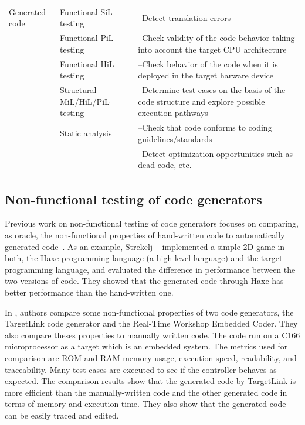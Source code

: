 \begin{table}[H]
{\begin{tabular}{| p{} | p{} |p{} |}
			Generated code 
			& Functional SiL testing & --Detect translation errors \\
			\cline{2-3}
			& Functional PiL testing & --Check validity of the code behavior taking into account the target CPU architecture \\
			\cline{2-3}
			& Functional HiL testing & --Check behavior of the code when it is deployed in the target harware device \\
			\cline{2-3}
			& Structural MiL/HiL/PiL testing & --Determine test cases on the basis of the code structure and explore possible execution pathways \\
			\cline{2-3}
			& Static analysis & --Check that code conforms to coding guidelines/standards\\
			&& --Detect optimization opportunities such as dead code, etc. \\
			\hline
		\end{tabular}}
		\label{tab:targetlink}
	\end{table}
 


\subsection{Non-functional testing of code generators}
\label{sec:Non-functional testing of code generators}
Previous work on non-functional testing of code generators focuses on comparing, as oracle, the non-functional properties of hand-written code to automatically generated code~\cite{stepasyuk2015evaluating,richard2013efficient}. As an example, Strekelj \etal~\cite{vstrekelj2015performance} implemented a simple 2D game in both, the Haxe programming language (a high-level language) and the target programming language, and evaluated the difference in performance between the two versions of code. They showed that the generated code through Haxe has better performance than the hand-written one. 

In \cite{ajwad2007evaluation}, authors compare some non-functional properties of two code generators, the TargetLink code generator and the Real-Time Workshop Embedded Coder. They also compare theses properties to manually written code. The code run on a C166 microprocessor as a target which is an embedded system.
The metrics used for comparison are ROM and RAM memory usage, execution speed, readability, and traceability. Many test cases are executed to see if the controller behaves as expected.
The comparison results show that the generated code by TargetLink is more efficient than the manually-written code and the other generated code in terms of memory and execution time. They also show that the generated code can be easily traced and edited.

